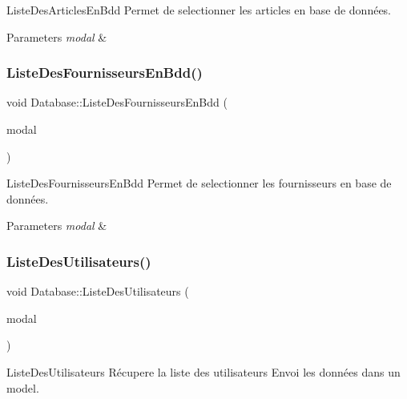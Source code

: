 Liste\+Des\+Articles\+En\+Bdd Permet de selectionner les articles en base de données. 


\begin{DoxyParams}{Parameters}
{\em modal} & \\
\hline
\end{DoxyParams}
\mbox{\label{class_database_addce242de8b2dd4ad9c4f2cde7e8da0a}} 
\subsubsection{\texorpdfstring{Liste\+Des\+Fournisseurs\+En\+Bdd()}{ListeDesFournisseursEnBdd()}}
{\footnotesize\ttfamily void Database\+::\+Liste\+Des\+Fournisseurs\+En\+Bdd (\begin{DoxyParamCaption}\item[{Q\+Sql\+Query\+Model $\ast$}]{modal }\end{DoxyParamCaption})}



Liste\+Des\+Fournisseurs\+En\+Bdd Permet de selectionner les fournisseurs en base de données. 


\begin{DoxyParams}{Parameters}
{\em modal} & \\
\hline
\end{DoxyParams}
\mbox{\label{class_database_a8ac8ec409038c20334f6217a3ac20f3b}} 
\subsubsection{\texorpdfstring{Liste\+Des\+Utilisateurs()}{ListeDesUtilisateurs()}}
{\footnotesize\ttfamily void Database\+::\+Liste\+Des\+Utilisateurs (\begin{DoxyParamCaption}\item[{Q\+Sql\+Query\+Model $\ast$}]{modal }\end{DoxyParamCaption})}



Liste\+Des\+Utilisateurs Récupere la liste des utilisateurs Envoi les données dans un model. 


